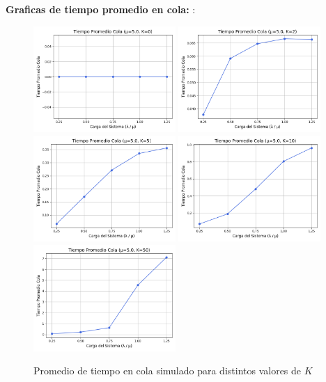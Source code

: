 \documentclass[12pt]{article}
\begin{document}
\textbf{Graficas de tiempo promedio en cola: }:
\begin{figure}[H]
    \centering
    \includegraphics[width=0.48\textwidth]{graficas/mm1k/k_0/tiempo_promedio_cola.png}
    \includegraphics[width=0.48\textwidth]{graficas/mm1k/k_2/tiempo_promedio_cola.png}
    \includegraphics[width=0.48\textwidth]{graficas/mm1k/k_5/tiempo_promedio_cola.png}
    \includegraphics[width=0.48\textwidth]{graficas/mm1k/k_10/tiempo_promedio_cola.png}
    \includegraphics[width=0.48\textwidth]{graficas/mm1k/k_50/tiempo_promedio_cola.png}
    \caption{Promedio de tiempo en cola simulado para distintos valores de \( K \)}
\end{figure}
\end{document}
